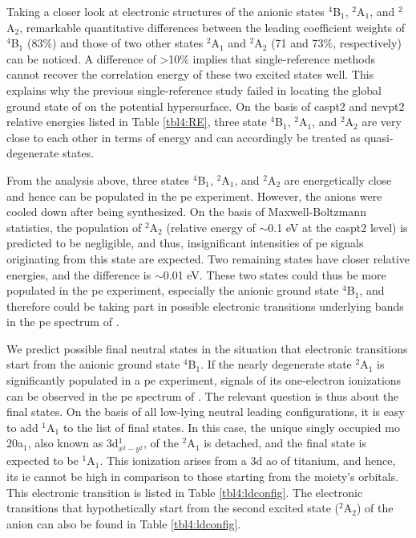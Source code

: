 \begin{refsection}
Taking a closer look at electronic structures of the anionic states $^4$B$_1$, $^2$A$_1$, and $^2$A$_2$, remarkable quantitative differences between the leading coefficient weights of $^4$B$_1$ (83$\%$) and those of two other states $^2$A$_1$ and $^2$A$_2$ (71 and 73$\%$, respectively) can be noticed. A difference of >10$\%$ implies that single-reference methods cannot recover the correlation energy of these two excited states well. This explains why the previous single-reference study \cite{c4:22} failed in locating the global ground state of  on the potential hypersurface. On the basis of \acrshort{caspt2} and \acrshort{nevpt2} relative energies listed in Table \ref{tbl4:RE}, three state $^4$B$_1$, $^2$A$_1$, and $^2$A$_2$ are very close to each other in terms of energy and can accordingly be treated as quasi-degenerate states.






From the analysis above, three states $^4$B$_1$, $^2$A$_1$, and $^2$A$_2$ are energetically close and hence can be populated in the \acrshort{pe} experiment. However, the anions  were cooled down after being synthesized. On the basis of Maxwell-Boltzmann statistics, the population of $^2$A$_2$ (relative energy of $\sim$0.1 eV at the \acrshort{caspt2} level) is predicted to be negligible, and thus, insignificant intensities of \acrshort{pe} signals originating from this state are expected. Two remaining states have closer relative energies, and the difference is $\sim$0.01 eV. These two states could thus be more populated in the \acrshort{pe} experiment, especially the anionic ground state $^4$B$_1$, and therefore could be taking part in possible electronic transitions underlying bands in the \acrshort{pe} spectrum of .






We predict possible final neutral states in the situation that electronic transitions start from the anionic ground state $^4$B$_1$. If the nearly degenerate state $^2$A$_1$ is significantly populated in a \acrshort{pe} experiment, signals of its one-electron ionizations can be observed in the \acrshort{pe} spectrum of . The relevant question is thus about the final states. On the basis of all low-lying neutral leading configurations, it is easy to add $^1$A$_1$ to the list of final states. In this case, the unique singly occupied \acrshort{mo} 20a$_1$, also known as 3d$_{x^2-y^2}^1$, of the $^2$A$_1$ is detached, and the final state is expected to be $^1$A$_1$. This ionization arises from a 3d \acrshort{ao} of titanium, and hence, its \acrshort{ie} cannot be high in comparison to those starting from the  moiety's orbitals. This electronic transition is listed in Table \ref{tbl4:ldconfig}. The electronic transitions that hypothetically start from the second excited state ($^2$A$_2$) of the anion can also be found in Table \ref{tbl4:ldconfig}. 




\end{refsection}
